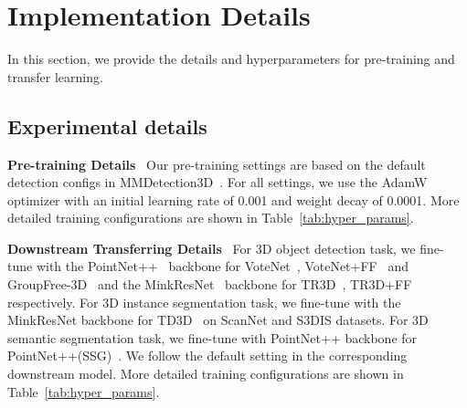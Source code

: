 \documentclass{article}
\begin{document}
{
\small


}

\appendix

\section{Implementation Details}\label{app:impl_detail}
In this section, we provide the details and hyperparameters for pre-training and transfer learning.

\subsection{Experimental details}
\textbf{Pre-training Details}~ Our pre-training settings are based on the default detection configs in MMDetection3D~\cite{mmdet3d2020}. For all settings, we use the AdamW optimizer with an initial learning rate of 0.001 and weight decay of 0.0001. More detailed training configurations are shown in Table~\ref{tab:hyper_params}.

\textbf{Downstream Transferring Details}~ For 3D object detection task, we fine-tune with the PointNet++~\cite{PointNet++} backbone for VoteNet~\cite{VoteNet}, VoteNet+FF~\cite{TR3D} and GroupFree-3D~\cite{GroupFree} and the MinkResNet~\cite{MinkowskiEngine} backbone for TR3D~\cite{TR3D}, TR3D+FF~\cite{TR3D} respectively. For 3D instance segmentation task, we fine-tune with the MinkResNet backbone for TD3D~\cite{TD3D} on ScanNet and S3DIS datasets. For 3D semantic segmentation task, we fine-tune with PointNet++ backbone for PointNet++(SSG)~\cite{PointNet++}. We follow the default setting in the corresponding downstream model.  More detailed training configurations are shown in Table~\ref{tab:hyper_params}.
\end{document}
